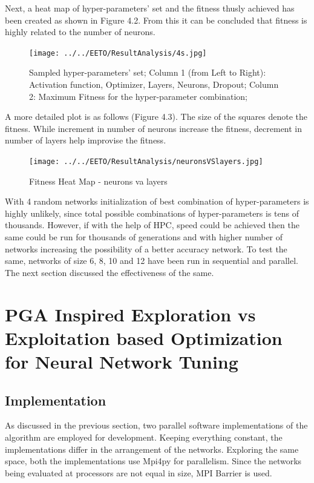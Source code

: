 Next, a heat map of hyper-parameters' set and the fitness thusly achieved has been created as shown in Figure 4.2. From this it can be concluded that fitness is highly related to the number of neurons.

\begin{figure}
	\texttt{[image: ../../EETO/ResultAnalysis/4s.jpg]}
	\caption{Sampled hyper-parameters' set; \newline Column 1 (from Left to Right): Activation function, Optimizer, Layers, Neurons, Dropout; \newline Column 2: Maximum Fitness for the hyper-parameter combination;}
\end{figure}

A more detailed plot is as follows (Figure 4.3). The size of the squares denote the
fitness. While increment in number of neurons increase the fitness, decrement in number of layers help improvise the fitness.

\begin{figure}
	\texttt{[image: ../../EETO/ResultAnalysis/neuronsVSlayers.jpg]}
	\caption{Fitness Heat Map - neurons va layers}
\end{figure}


With 4 random networks initialization of best combination of hyper-parameters is highly unlikely, since total possible combinations of hyper-parameters is tens of thousands.
However, if with the help of HPC, speed could be achieved then the same could be run for thousands of generations and with higher number of networks increasing the possibility of a better accuracy network. To test the same, networks of size 6, 8, 10 and 12 have been run in sequential and parallel. The next section discussed the effectiveness of the same.


\section{PGA Inspired Exploration vs Exploitation based Optimization for Neural Network Tuning}



\subsection{Implementation}

As discussed in the previous section, two parallel software implementations of the algorithm are employed for development. Keeping everything constant, the implementations differ in the arrangement of the networks. Exploring the same space, both the implementations use Mpi4py for parallelism. Since the networks being evaluated at processors are not equal in size, MPI Barrier is used.



